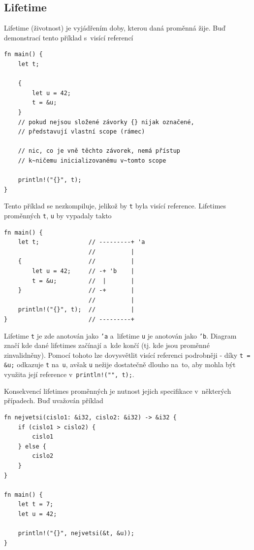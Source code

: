 \documentclass[a4paper, 12pt]{article} %
\newcommand{\rust}[1]{\texttt{#1}}
\begin{document}
        \subsection{Lifetime}
            Lifetime (životnost) je vyjádřením doby, kterou daná proměnná žije. Buď demonstrací tento příklad s~visící referencí
            \begin{verbatim}
fn main() {
    let t;

    {
        let u = 42;
        t = &u;
    }
    // pokud nejsou složené závorky {} nijak označené,
    // představují vlastní scope (rámec)

    // nic, co je vně těchto závorek, nemá přístup
    // k~ničemu inicializovanému v~tomto scope

    println!("{}", t);
}
            \end{verbatim}
            
            Tento příklad se nezkompiluje, jelikož by \rust{t} byla visící reference. Lifetimes proměnných \rust{t}, \rust{u} by vypadaly takto
            \begin{verbatim}
fn main() {
    let t;              // ---------+ 'a
                        //          |
    {                   //          |
        let u = 42;     // -+ 'b    |
        t = &u;         //  |       |
    }                   // -+       |
                        //          |
    println!("{}", t);  //          |
}                       // ---------+
            \end{verbatim}
            
            Lifetime \rust{t} je zde anotován jako \rust{'a} a~lifetime \rust{u} je anotován jako \rust{'b}. Diagram značí kde dané lifetimes začínají a~kde končí (tj. kde jsou proměnné zinvalidněny). Pomocí tohoto lze dovysvětlit visící referenci podrobněji - díky \rust{t = &u;} odkazuje \rust{t} na~\rust{u}, avšak \rust{u} nežije dostatečně dlouho na~to, aby mohla být využita její reference v~\rust{println!("{}", t);}.
            
            Konsekvencí lifetimes proměnných je nutnost jejich specifikace v~některých případech. Buď uvažován příklad
            \begin{verbatim}
fn nejvetsi(cislo1: &i32, cislo2: &i32) -> &i32 {
    if (cislo1 > cislo2) {
        cislo1
    } else {
        cislo2
    }
}

fn main() {
    let t = 7;
    let u = 42;
    
    println!("{}", nejvetsi(&t, &u));
}
            \end{verbatim}
            
\end{document}

